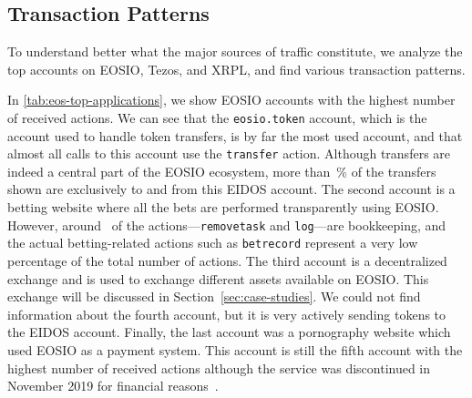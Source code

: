 


 



\subsection{Transaction Patterns}
To understand better what the major sources of traffic constitute, we analyze the top accounts on EOSIO, Tezos, and XRPL, and find various transaction patterns.

In \autoref{tab:eos-top-applications}, we show EOSIO accounts with the highest number of received actions.
We can see that the \texttt{eosio.token} account, which is the account used to handle  token transfers, is by far the most used account, and that almost all calls to this account use the \texttt{transfer} action.
Although  transfers are indeed a central part of the EOSIO ecosystem, more than~\% of the transfers shown are exclusively to and from this EIDOS account.
The second account is a betting website where all the bets are performed transparently using EOSIO.
However, around~ of the actions---\texttt{removetask} and \texttt{log}---are bookkeeping, and the actual betting-related actions such as \texttt{betrecord} represent a very low percentage of the total number of actions.
The third account is a decentralized exchange and is used to exchange different assets available on EOSIO. This exchange will be discussed in Section~\ref{sec:case-studies}.
We could not find information about the fourth account, but it is very actively sending  tokens to the EIDOS account.
Finally, the last account was a pornography website which used EOSIO as a payment system. This account is still the fifth account with the highest number of received actions although the service was discontinued in November 2019 for financial reasons~\cite{hashbaby-closing}.

